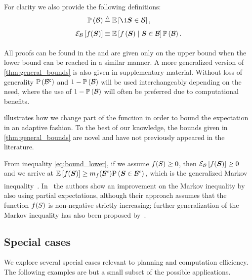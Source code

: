 For clarity we also provide the following definitions:
\begin{align*}
		\measure{\subSpace} & \triangleq \expectation{\1{\RV\in \subSpace}}{},\\
		\partialexpectation{f(\RV)}{\subSpace} &\equiv\expectation{f\left(\RV\right)\mid\RV\in\subSpace}{}\measure{\subSpace}.
\end{align*}

All proofs can be found in the  and are given only on the upper bound when the lower bound can be reached in a similar manner. A more generalized version of \cref{thm:general_bounds} is also given in supplementary material.
Without loss of generality $\mathbb{P}\left({{\mathcal B}^{\mathsf{c}}}\right)$ and $1-\mathbb{P}\left({\mathcal B}\right)$ will be used interchangeably depending on the need, where the use of $1-\mathbb{P}\left({\mathcal B}\right)$ will often be preferred due to computational benefits.


 illustrates how we change part of the function in order to bound the expectation in an adaptive fashion. To the best of our knowledge, the bounds given in \cref{thm:general_bounds} are novel and have not previously appeared in the literature.

From inequality \eqref{eq:bound_lower}, if we assume $f(S)\geq0$, then $\mathcal{E}_{\mathcal B}\left[{f(\boldsymbol S)}\right]\geq0$ and we arrive at $\operatorname*{\mathbb{E}}\limits_{}\left[{f(\boldsymbol S)}\right]\geq m_f({\mathcal B}^{\mathsf{c}})\mathrm{P}\left({\boldsymbol S\in{\ensuremath{\mathcal B}}^{\mathsf{c}}}\right),$ which is the generalized Markov inequality~\cite{Durrett19book}. In~\cite{Ogasawara21} the authors show an improvement on the Markov inequality by also using partial expectations, although their approach assumes that the function $f(S)$ is non-negative strictly increasing; further generalization of the Markov inequality has also been proposed by~\cite{Bhat22spl}.


\subsection{Special cases}
We explore several special cases relevant to planning and computation efficiency. The following examples are but a small subset of the possible applications.

